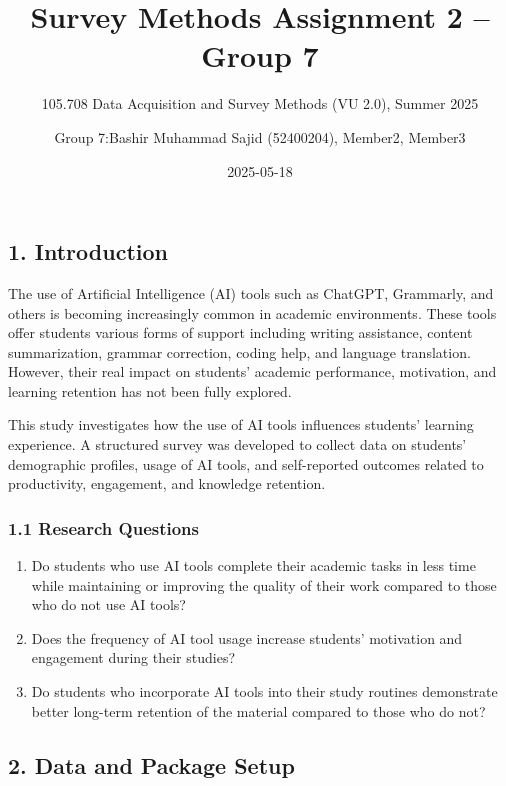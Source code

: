 \documentclass[
]{article}
\title{Survey Methods Assignment 2 -- Group 7}
\subtitle{105.708 Data Acquisition and Survey Methods (VU 2.0), Summer
2025}
\author{Group 7:Bashir Muhammad Sajid (52400204), Member2, Member3}
\date{2025-05-18}
\begin{document}
\maketitle

{
\setcounter{tocdepth}{3}
\tableofcontents
}
\subsection{1. Introduction}\label{introduction}

The use of Artificial Intelligence (AI) tools such as ChatGPT,
Grammarly, and others is becoming increasingly common in academic
environments. These tools offer students various forms of support
including writing assistance, content summarization, grammar correction,
coding help, and language translation. However, their real impact on
students' academic performance, motivation, and learning retention has
not been fully explored.

This study investigates how the use of AI tools influences students'
learning experience. A structured survey was developed to collect data
on students' demographic profiles, usage of AI tools, and self-reported
outcomes related to productivity, engagement, and knowledge retention.

\subsubsection{1.1 Research Questions}\label{research-questions}

\begin{enumerate}
\def\labelenumi{\arabic{enumi}.}
\item
  Do students who use AI tools complete their academic tasks in less
  time while maintaining or improving the quality of their work compared
  to those who do not use AI tools?
\item
  Does the frequency of AI tool usage increase students' motivation and
  engagement during their studies?
\item
  Do students who incorporate AI tools into their study routines
  demonstrate better long-term retention of the material compared to
  those who do not?
\end{enumerate}

\subsection{2. Data and Package Setup}\label{data-and-package-setup}
\end{document}
